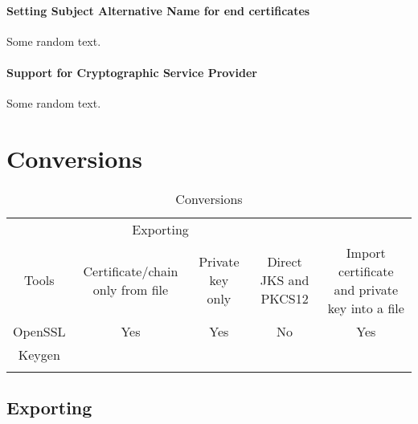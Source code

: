 \documentclass[10pt, a4paper]{report}
\begin{document}
\paragraph{Setting Subject Alternative Name for end certificates}
Some random text.

\paragraph{Support for Cryptographic Service Provider}
Some random text.


\newpage

\section{Conversions}

\begin{table}[h!]
\centering
\caption{Conversions}
\label{my-label}
\begin{adjustbox}{max width=\textwidth}
\begin{tabular}{|c|c|c|c|c|}
\hline
                        & \multicolumn{2}{c|}{Exporting}                                 &                                         &                                                                  \\ \cline{2-3}
\multirow{-2}{*}{Tools} & Certificate/chain only from file & Private key only            & \multirow{-2}{*}{Direct JKS and PKCS12} & \multirow{-2}{*}{Import certificate and private key into a file} \\ \hline
OpenSSL                 & \cellcolor[HTML]{34FF34}Yes      & \cellcolor[HTML]{34FF34}Yes & \cellcolor[HTML]{FF3A3A}No              & \cellcolor[HTML]{34FF34}Yes                                      \\ \hline
Keygen                  &                                  &                             &                                         &                                                                  \\ \hline
                        &                                  &                             &                                         &                                                                  \\ \hline
\end{tabular}
\end{adjustbox}
\end{table}


\subsection{Exporting}
\end{document}
